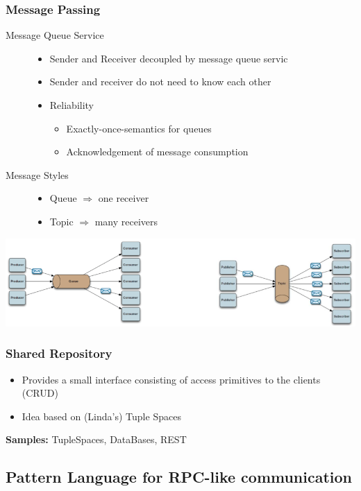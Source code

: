 \documentclass[10pt]{article}
\newcommand{\Ra}{\Rightarrow}
\begin{document}
\subsubsection{Message Passing}
\begin{description}
	\item[Message Queue Service] \hfill
		\begin{itemize}
			\item Sender and Receiver decoupled by message queue servic
			\item Sender and receiver do not need to know each other
			\item Reliability
				\begin{itemize}
					\item Exactly-once-semantics for queues
					\item Acknowledgement of message consumption
				\end{itemize}
		\end{itemize}
	\item[Message Styles] \hfill
		\begin{itemize}
			\item Queue $\Ra$ one receiver
			\item Topic $\Ra$ many receivers 
		\end{itemize}
\end{description}
\begin{center}
	\includegraphics[scale=0.4]{images/remote-message-passing.png}
\end{center}
\subsubsection{Shared Repository}
\begin{itemize}
	\item Provides a small interface consisting of access primitives to the clients (CRUD)
	\item Idea based on (Linda's) Tuple Spaces
\end{itemize}
\textbf{Samples:} TupleSpaces, DataBases, REST
\subsection{Pattern Language for RPC-like communication}
\end{document}
